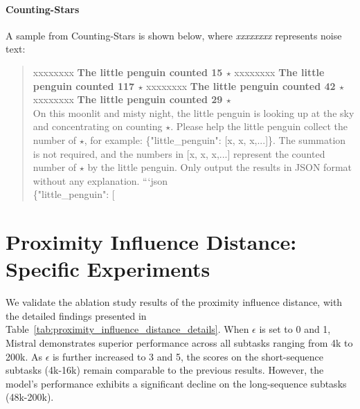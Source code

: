 \paragraph{Counting-Stars}
A sample from Counting-Stars is shown below, where \textit{xxxxxxxx} represents noise text:
\begin{quote}
  xxxxxxxx \textbf{The little penguin counted 15 $\star$} xxxxxxxx \textbf{The little penguin counted 117 $\star$} xxxxxxxx \textbf{The little penguin counted 42 $\star$} xxxxxxxx \textbf{The little penguin counted 29 $\star$} \\
  On this moonlit and misty night, the little penguin is looking up at the sky and concentrating on counting $\star$. Please help the little penguin collect the number of $\star$, for example: \{"little\_penguin": [x, x, x,...]\}. The summation is not required, and the numbers in [x, x, x,...] represent the counted number of $\star$ by the little penguin. Only output the results in JSON format without any explanation. 
  ```json \\
  \{"little\_penguin": [
\end{quote}




\section{Proximity Influence Distance: Specific Experiments} \label{appen_proxi_influ}
We validate the ablation study results of the proximity influence distance, with the detailed findings presented in Table~\ref{tab:proximity_influence_distance_details}. 
When \( \epsilon \) is set to 0 and 1, Mistral demonstrates superior performance across all subtasks ranging from 4k to 200k. 
As \( \epsilon \) is further increased to 3 and 5, the scores on the short-sequence subtasks (4k-16k) remain comparable to the previous results. 
However, the model's performance exhibits a significant decline on the long-sequence subtasks (48k-200k).


